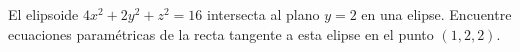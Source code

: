 \item El elipsoide $4x^2 + 2y^2 + z^2 = 16$ intersecta al plano $y = 2$ en una elipse. Encuentre ecuaciones paramétricas de la recta tangente a esta elipse en el punto $(1, 2, 2)$.

